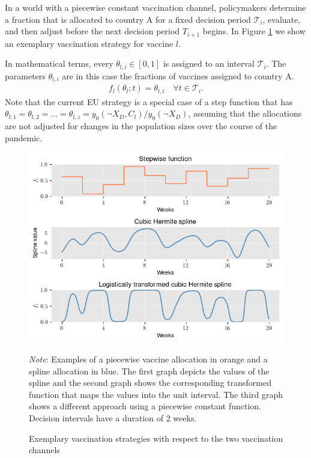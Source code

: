 In a world with a piecewise constant vaccination channel, policymakers determine a fraction that is allocated to country A for a fixed decision period $\mathcal{T}_i$, evaluate, and then adjust before the next decision period $T_{i+1}$ begins. In Figure \ref{fig:examples} we show an exemplary vaccination strategy for vaccine $l$.

In mathematical terms, every $\theta_{l,i} \in [0,1]$ is assigned to an interval $\mathcal{T}_i$. The parameters $\theta_{l,i}$ are in this case the fractions of vaccines assigned to country A.
\begin{align}
f_l(\theta_l; t) = \theta_{l,i} \quad \forall t \in \mathcal{T}_i.
\end{align}
Note that the current EU strategy is a special case of a step function that has $\theta_{l;1}= \theta_{l,2} = \hdots = \theta_{l,z}=y_0(\neg X_D, C_l)/y_0(\neg X_D)$, assuming that the allocations are not adjusted for changes in the population sizes over the course of the pandemic.
\begin{figure}[h!]
\centering
\includegraphics[scale=0.8]{images/example_methods.png}\\
\begin{flushleft}
\scriptsize{\textit{Note}: Examples of a piecewise vaccine allocation in orange and a spline allocation in blue. The first graph depicts the values of the spline and the second graph shows the corresponding transformed function that maps the values into the unit interval. The third graph shows a different approach using a piecewise constant function. Decision intervals have a duration of 2 weeks.}
\end{flushleft}
\caption{Exemplary vaccination strategies with respect to the two vaccination channels}
\label{fig:examples}
\end{figure}

